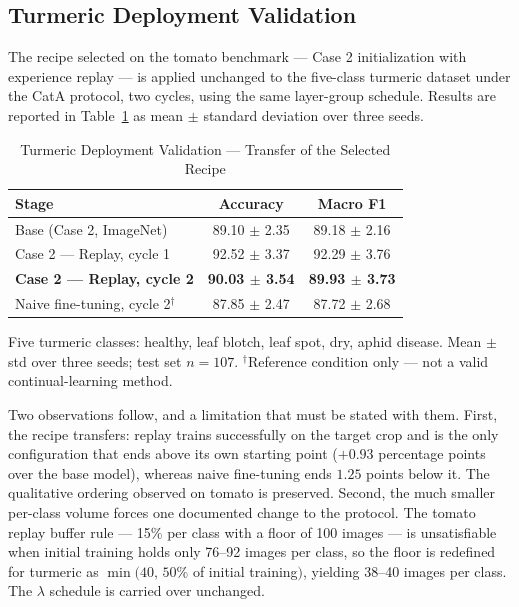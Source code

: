 \documentclass[journal]{IEEEtran}
\begin{document}
\subsection{Turmeric Deployment Validation}
\label{subsec:turmeric}

The recipe selected on the tomato benchmark --- Case 2 initialization with
experience replay --- is applied unchanged to the five-class turmeric dataset under
the CatA protocol, two cycles, using the same layer-group schedule. Results are
reported in Table~\ref{tab:turmeric} as mean $\pm$ standard deviation over three
seeds.

\begin{table}[!tbp]
\caption{Turmeric Deployment Validation --- Transfer of the Selected Recipe}
\label{tab:turmeric}
\centering
\small
\begin{tabular}{@{}lcc@{}}
\toprule
\textbf{Stage} & \textbf{Accuracy} & \textbf{Macro F1} \\
\midrule
Base (Case 2, ImageNet)      & 89.10 $\pm$ 2.35 & 89.18 $\pm$ 2.16 \\
Case 2 --- Replay, cycle 1   & 92.52 $\pm$ 3.37 & 92.29 $\pm$ 3.76 \\
\textbf{Case 2 --- Replay, cycle 2} & \textbf{90.03 $\pm$ 3.54} & \textbf{89.93 $\pm$ 3.73} \\
\midrule
Naive fine-tuning, cycle 2$^{\dagger}$ & 87.85 $\pm$ 2.47 & 87.72 $\pm$ 2.68 \\
\bottomrule
\end{tabular}

\vspace{2pt}
\begin{minipage}{\columnwidth}
\footnotesize Five turmeric classes: healthy, leaf blotch, leaf spot, dry, aphid
disease. Mean $\pm$ std over three seeds; test set $n=107$.
$^{\dagger}$Reference condition only --- not a valid continual-learning method.
\end{minipage}
\end{table}

Two observations follow, and a limitation that must be stated with them. First, the
recipe transfers: replay trains successfully on the target crop and is the only
configuration that ends above its own starting point ($+0.93$ percentage points over
the base model), whereas naive fine-tuning ends $1.25$ points below it. The
qualitative ordering observed on tomato is preserved. Second, the much smaller
per-class volume forces one documented change to the protocol. The tomato replay
buffer rule --- 15\% per class with a floor of 100 images --- is unsatisfiable when
initial training holds only 76--92 images per class, so the floor is redefined for
turmeric as $\min(40,\,50\%$ of initial training$)$, yielding 38--40 images per
class. The $\lambda$ schedule is carried over unchanged.
\end{document}
